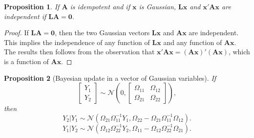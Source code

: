 \documentclass[
  12pt,
]{book}
\newtheorem{proposition}{Proposition}[chapter]
\theoremstyle{definition}
\theoremstyle{definition}
\theoremstyle{definition}
\theoremstyle{definition}
\theoremstyle{remark}
\begin{document}
\begin{proposition}
\protect\hypertarget{prp:bandsindependent}{}\label{prp:bandsindependent}If \(\mathbf{A}\) is idempotent and if \(\mathbf{x}\) is Gaussian, \(\mathbf{L}\mathbf{x}\) and \(\mathbf{x}'\mathbf{A}\mathbf{x}\) are independent if \(\mathbf{L}\mathbf{A}=\mathbf{0}\).
\end{proposition}

\begin{proof}
If \(\mathbf{L}\mathbf{A}=\mathbf{0}\), then the two Gaussian vectors \(\mathbf{L}\mathbf{x}\) and \(\mathbf{A}\mathbf{x}\) are independent. This implies the independence of any function of \(\mathbf{L}\mathbf{x}\) and any function of \(\mathbf{A}\mathbf{x}\). The results then follows from the observation that \(\mathbf{x}'\mathbf{A}\mathbf{x}=(\mathbf{A}\mathbf{x})'(\mathbf{A}\mathbf{x})\), which is a function of \(\mathbf{A}\mathbf{x}\).
\end{proof}

\begin{proposition}[Bayesian update in a vector of Gaussian variables]
\protect\hypertarget{prp:update}{}\label{prp:update}If
\[
\left[
\begin{array}{c}
Y_1\\
Y_2
\end{array}
\right]
\sim \mathcal{N}
\left(0,
\left[\begin{array}{cc}
\Omega_{11} & \Omega_{12}\\
\Omega_{21} & \Omega_{22}
\end{array}\right]
\right),
\]
then
\[
Y_{2}|Y_{1} \sim \mathcal{N}
\left(
\Omega_{21}\Omega_{11}^{-1}Y_{1},\Omega_{22}-\Omega_{21}\Omega_{11}^{-1}\Omega_{12}
\right).
\]
\[
Y_{1}|Y_{2} \sim \mathcal{N}
\left(
\Omega_{12}\Omega_{22}^{-1}Y_{2},\Omega_{11}-\Omega_{12}\Omega_{22}^{-1}\Omega_{21}
\right).
\]
\end{proposition}
\end{document}
